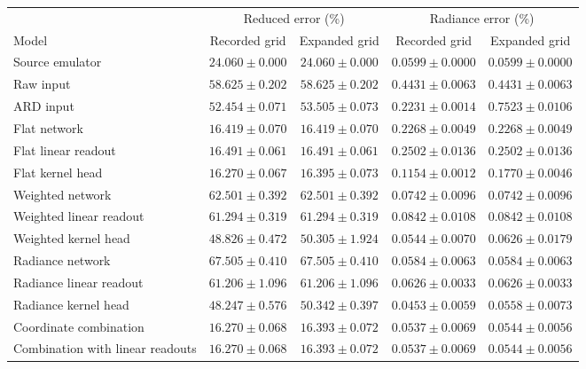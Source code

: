 \begin{tabular}{lcccc}
\toprule
& \multicolumn{2}{c}{Reduced error (\%)} & \multicolumn{2}{c}{Radiance error (\%)} \\
\cmidrule(lr){2-3}\cmidrule(lr){4-5}
Model & Recorded grid & Expanded grid & Recorded grid & Expanded grid \\
\midrule
Source emulator & $24.060\pm0.000$ & $24.060\pm0.000$ & $0.0599\pm0.0000$ & $0.0599\pm0.0000$ \\
Raw input & $58.625\pm0.202$ & $58.625\pm0.202$ & $0.4431\pm0.0063$ & $0.4431\pm0.0063$ \\
ARD input & $52.454\pm0.071$ & $53.505\pm0.073$ & $0.2231\pm0.0014$ & $0.7523\pm0.0106$ \\
Flat network & $16.419\pm0.070$ & $16.419\pm0.070$ & $0.2268\pm0.0049$ & $0.2268\pm0.0049$ \\
Flat linear readout & $16.491\pm0.061$ & $16.491\pm0.061$ & $0.2502\pm0.0136$ & $0.2502\pm0.0136$ \\
Flat kernel head & $16.270\pm0.067$ & $16.395\pm0.073$ & $0.1154\pm0.0012$ & $0.1770\pm0.0046$ \\
Weighted network & $62.501\pm0.392$ & $62.501\pm0.392$ & $0.0742\pm0.0096$ & $0.0742\pm0.0096$ \\
Weighted linear readout & $61.294\pm0.319$ & $61.294\pm0.319$ & $0.0842\pm0.0108$ & $0.0842\pm0.0108$ \\
Weighted kernel head & $48.826\pm0.472$ & $50.305\pm1.924$ & $0.0544\pm0.0070$ & $0.0626\pm0.0179$ \\
Radiance network & $67.505\pm0.410$ & $67.505\pm0.410$ & $0.0584\pm0.0063$ & $0.0584\pm0.0063$ \\
Radiance linear readout & $61.206\pm1.096$ & $61.206\pm1.096$ & $0.0626\pm0.0033$ & $0.0626\pm0.0033$ \\
Radiance kernel head & $48.247\pm0.576$ & $50.342\pm0.397$ & $0.0453\pm0.0059$ & $0.0558\pm0.0073$ \\
Coordinate combination & $16.270\pm0.068$ & $16.393\pm0.072$ & $0.0537\pm0.0069$ & $0.0544\pm0.0056$ \\
Combination with linear readouts & $16.270\pm0.068$ & $16.393\pm0.072$ & $0.0537\pm0.0069$ & $0.0544\pm0.0056$ \\
\bottomrule
\end{tabular}

